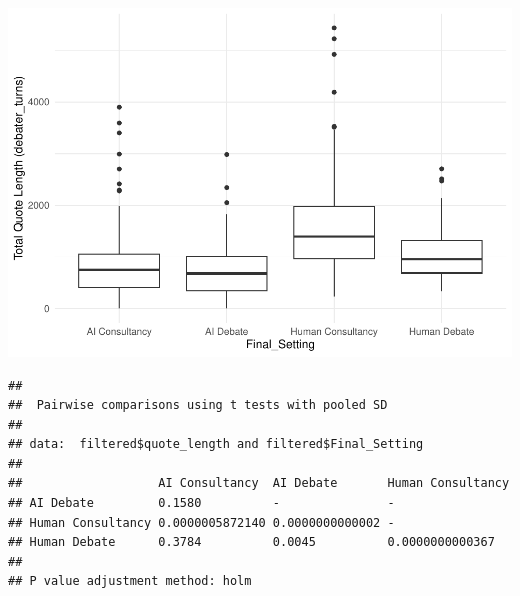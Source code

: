 \documentclass[
]{article}
\newenvironment{Shaded}{\begin{snugshade}}{\end{snugshade}}
\newcommand{\FunctionTok}[1]{\textcolor[rgb]{0.00,0.00,0.00}{#1}}
\newcommand{\NormalTok}[1]{#1}
\newcommand{\SpecialCharTok}[1]{\textcolor[rgb]{0.00,0.00,0.00}{#1}}
\begin{document}
\includegraphics[width=1\linewidth]{debate-2309_files/figure-latex/quote_length graph-3}

\begin{Shaded}
\end{Shaded}

\begin{verbatim}
## 
##  Pairwise comparisons using t tests with pooled SD 
## 
## data:  filtered$quote_length and filtered$Final_Setting 
## 
##                   AI Consultancy  AI Debate       Human Consultancy
## AI Debate         0.1580          -               -                
## Human Consultancy 0.0000005872140 0.0000000000002 -                
## Human Debate      0.3784          0.0045          0.0000000000367  
## 
## P value adjustment method: holm
\end{verbatim}
\end{document}
